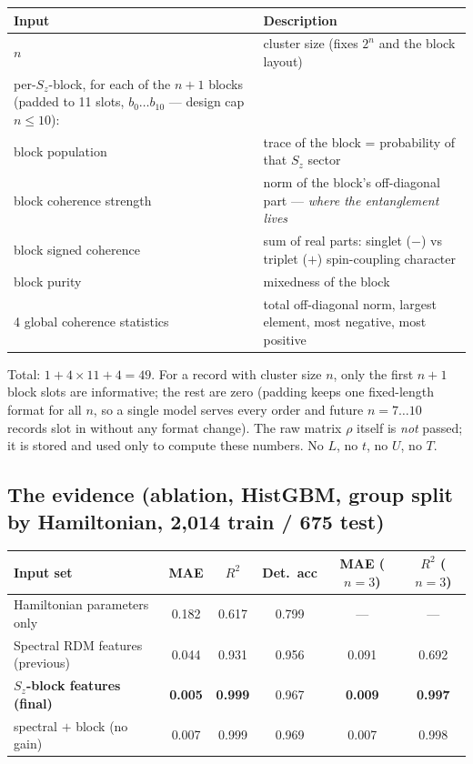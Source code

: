 \documentclass[11pt]{article}
\begin{document}
\begin{center}
\begin{tabular}{@{}lp{9.6cm}@{}}
\toprule
Input & Description \\ \midrule
$n$ & cluster size (fixes $2^n$ and the block layout) \\
per-$S_z$-block, for each of the $n{+}1$ blocks (padded to 11 slots,
  $b_0\ldots b_{10}$ --- design cap $n\le10$): & \\
\quad block population & trace of the block = probability of that $S_z$
  sector \\
\quad block coherence strength & norm of the block's off-diagonal part ---
  \emph{where the entanglement lives} \\
\quad block signed coherence & sum of real parts: singlet ($-$) vs triplet
  ($+$) spin-coupling character \\
\quad block purity & mixedness of the block \\
4 global coherence statistics & total off-diagonal norm, largest element,
  most negative, most positive \\
\bottomrule
\end{tabular}
\end{center}
Total: $1+4\times11+4=49$. For a record with cluster size $n$, only the first
$n{+}1$ block slots are informative; the rest are zero (padding keeps one
fixed-length format for all $n$, so a single model serves every order and
future $n=7\ldots10$ records slot in without any format change). The raw
matrix $\rho$ itself is \emph{not} passed; it is stored and used only to
compute these numbers. No $L$, no $t$, no $U$, no $T$.

\subsection{The evidence (ablation, HistGBM, group split by Hamiltonian,
2{,}014 train / 675 test)}
\begin{center}
\begin{tabular}{@{}lccccc@{}}
\toprule
Input set & MAE & $R^2$ & Det.\ acc & MAE ($n{=}3$) & $R^2$ ($n{=}3$) \\
\midrule
Hamiltonian parameters only          & 0.182 & 0.617 & 0.799 & --- & --- \\
Spectral RDM features (previous)     & 0.044 & 0.931 & 0.956 & 0.091 & 0.692 \\
\textbf{$S_z$-block features (final)} & \textbf{0.005} & \textbf{0.999} &
  0.967 & \textbf{0.009} & \textbf{0.997} \\
spectral $+$ block (no gain)         & 0.007 & 0.999 & 0.969 & 0.007 & 0.998 \\
\bottomrule
\end{tabular}
\end{center}
\end{document}
